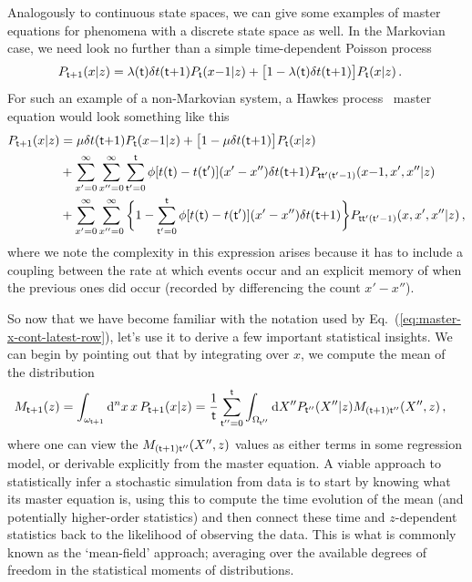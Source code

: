 Analogously to continuous state spaces, we can give some examples of master equations for phenomena with a discrete state space as well. In the Markovian case, we need look no further than a simple time-dependent Poisson process
\begin{align}
P_{{\sf t}+1}(x\vert z) &= \lambda ({\sf t}) \delta t({\sf t}{+}1)P_{{\sf t}}(x{-}1\vert z) + \big[1-\lambda ({\sf t}) \delta t({\sf t}{+}1)\big] P_{{\sf t}}(x\vert z) \,.
\end{align}
For such an example of a non-Markovian system, a Hawkes process~\cite{hawkes1971spectra} master equation would look something like this
\begin{align}
P_{{\sf t}+1}(x\vert z) &= \mu \delta t({\sf t}{+}1)P_{{\sf t}}(x{-}1\vert z) + \big[ 1-\mu \delta t({\sf t}{+}1)\big] P_{{\sf t}}(x\vert z) \nonumber \\
& + \sum_{x'=0}^\infty\sum_{x''=0}^\infty\sum_{{\sf t}'=0}^{{\sf t}} \phi [t({\sf t})-t({\sf t}')] (x'-x'') \delta t({\sf t}{+}1)P_{{\sf t}{\sf t}'({\sf t}'-1)}(x{-}1,x',x''\vert z) \nonumber \\
&+ \sum_{x'=0}^\infty\sum_{x''=0}^\infty\bigg\lbrace 1-\sum_{{\sf t}'=0}^{{\sf t}} \phi [t({\sf t})-t({\sf t}')] (x'-x'') \delta t({\sf t}{+}1)\bigg\rbrace P_{{\sf t}{\sf t}'({\sf t}'-1)}(x, x', x''\vert z) \,,
\end{align}
where we note the complexity in this expression arises because it has to include a coupling between the rate at which events occur and an explicit memory of when the previous ones did occur (recorded by differencing the count $x'-x''$).

So now that we have become familiar with the notation used by Eq.~(\ref{eq:master-x-cont-latest-row}), let's use it to derive a few important statistical insights. We can begin by pointing out that by integrating over $x$, we compute the mean of the distribution
\begin{align}
M_{{\sf t}+1}(z) &= \int_{\omega_{{\sf t}+1}}{\rm d}^nx \,x\, P_{{\sf t}+1}(x\vert z) = \frac{1}{{\sf t}}\sum_{{\sf t}''=0}^{{\sf t}} \int_{\Omega_{{\sf t}''}}{\rm d}X'' P_{{\sf t}''}(X''\vert z) M_{({\sf t}+1){\sf t}''}(X'',z) \,,
\end{align}
where one can view the $M_{({\sf t}+1){\sf t}''}(X'',z)$ values as either terms in some regression model, or derivable explicitly from the master equation. A viable approach to statistically infer a stochastic simulation from data is to start by knowing what its master equation is, using this to compute the time evolution of the mean (and potentially higher-order statistics) and then connect these time and $z$-dependent statistics back to the likelihood of observing the data. This is what is commonly known as the `mean-field' approach; averaging over the available degrees of freedom in the statistical moments of distributions.

